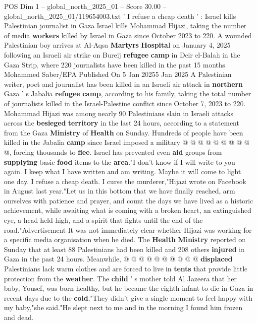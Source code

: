 \begin{textsample}{POS Dim 1 – global\_north\_2025\_01 – Score 30.00 – global\_north\_2025\_01/119654003.txt}  \label{ex:f1_pos_370}
' I refuse a cheap death ' : Israel kills Palestinian journalist in Gaza Israel kills Mohammad Hijazi, taking the number of media \textbf{workers} killed by Israel in Gaza since October 2023 to 220.
A wounded Palestinian boy arrives at Al-Aqsa \textbf{Martyrs} \textbf{Hospital} on January 4, 2025 following an Israeli air strike on Bureij \textbf{refugee} \textbf{camp} in Deir el-Balah in the Gaza Strip, where 220 journalists have been killed in the past 15 months Mohammed Saber/EPA Published On 5 Jan 20255 Jan 2025 A Palestinian writer, poet and journalist has been killed in an Israeli air attack in \textbf{northern} Gaza ' s Jabalia \textbf{refugee} \textbf{camp}, according to his family, taking the total number of journalists killed in the Israel-Palestine conflict since October 7, 2023 to 220.
Mohammad Hijazi was among nearly 90 Palestinians slain in Israeli attacks across the \textbf{besieged} \textbf{territory} in the last 24 hours, according to a statement from the Gaza \textbf{Ministry} of \textbf{Health} on Sunday.
Hundreds of people have been killed in the Jabalia \textbf{camp} since Israel imposed a military @ @ @ @ @ @ @ @ @ @, forcing thousands to \textbf{flee}.
Israel has prevented even \textbf{aid} groups from \textbf{supplying} basic \textbf{food} items to the \textbf{area}."I don't know if I will write to you again.
I keep what I have written and am writing.
Maybe it will come to light one day.
I refuse a cheap death.
I curse the murderer,"Hijazi wrote on Facebook in August last year."Let us in this bottom that we have finally reached, arm ourselves with patience and prayer, and count the days we have lived as a historic achievement, while awaiting what is coming with a broken heart, an extinguished eye, a head held high, and a spirit that fights until the end of the road."Advertisement It was not immediately clear whether Hijazi was working for a specific media organisation when he died.
The \textbf{Health} \textbf{Ministry} reported on Sunday that at least 88 Palestinians had been killed and 208 others \textbf{injured} in Gaza in the past 24 hours.
Meanwhile, @ @ @ @ @ @ @ @ @ @ \textbf{displaced} Palestinians lack warm clothes and are forced to live in \textbf{tents} that provide little protection from the \textbf{weather}.
The \textbf{child} ' s mother told Al Jazeera that her baby, Yousef, was born healthy, but he became the eighth infant to die in Gaza in recent days due to the \textbf{cold}."They didn't give a single moment to feel happy with my baby,"she said."He slept next to me and in the morning I found him frozen and dead.

\end{textsample}
